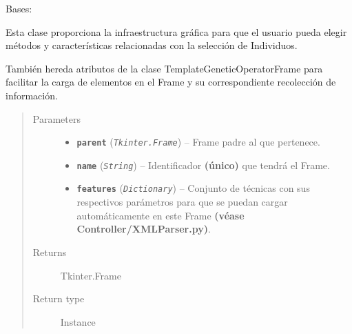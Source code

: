 \documentclass[letterpaper,10pt,english]{sphinxmanual}
\begin{document}
\begin{fulllineitems}
\label{View/Main/GeneticOperator/TemplateGeneticOperator/SelectionFrame:View.Main.GeneticOperator.SelectionFrame.SelectionFrame}
Bases: {\hyperref[View/Main/GeneticOperator/TemplateGeneticOperator/TemplateGeneticOperatorFrame:View.Main.GeneticOperator.TemplateGeneticOperator.TemplateGeneticOperatorFrame.TemplateGeneticOperatorFrame]{}}

\begin{DUlineblock}{0em}
\item[] Esta clase proporciona la infraestructura gráfica para que el usuario pueda 
elegir métodos y características relacionadas con la selección de Individuos.
\item[] También hereda atributos de la clase TemplateGeneticOperatorFrame para facilitar
la carga de elementos en el Frame y su correspondiente recolección de información.
\end{DUlineblock}
\begin{quote}\begin{description}
\item[{Parameters}] \leavevmode\begin{itemize}
\item {} 
\textbf{\texttt{parent}} (\emph{\texttt{Tkinter.Frame}}) -- Frame padre al que pertenece.

\item {} 
\textbf{\texttt{name}} (\emph{\texttt{String}}) -- Identificador \textbf{(único)} que tendrá el Frame.

\item {} 
\textbf{\texttt{features}} (\emph{\texttt{Dictionary}}) -- Conjunto de técnicas con sus respectivos parámetros para que
se puedan cargar automáticamente en este Frame \textbf{(véase
Controller/XMLParser.py)}.

\end{itemize}

\item[{Returns}] \leavevmode
Tkinter.Frame

\item[{Return type}] \leavevmode
Instance

\end{description}\end{quote}


\end{fulllineitems}
\end{document}
